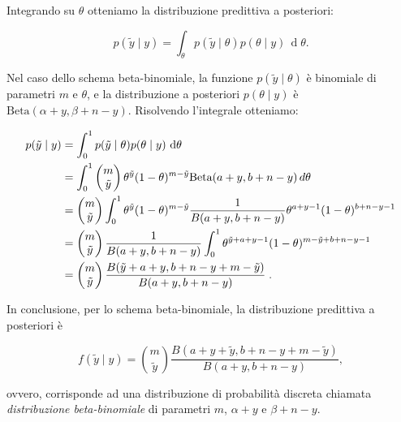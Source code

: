 \documentclass[
  11pt,
]{krantz}
\theoremstyle{definition}
\theoremstyle{definition}
\theoremstyle{definition}
\theoremstyle{definition}
\theoremstyle{remark}
\begin{document}
Integrando su \(\theta\) otteniamo la distribuzione predittiva a posteriori:

\begin{equation}
p(\tilde{y} \mid y) = \int_{\theta} p(\tilde{y} \mid \theta) p(\theta \mid y) \,\operatorname {d}\!\theta.
\end{equation}

Nel caso dello schema beta-binomiale, la funzione \(p(\tilde{y} \mid \theta)\) è binomiale di parametri \(m\) e \(\theta\), e la distribuzione a posteriori \(p(\theta \mid y)\) è \(\mbox{Beta}(\alpha + y, \beta + n - y)\). Risolvendo l'integrale otteniamo:

\begin{align}
p(\tilde{y} \mid y) &= \int_0^1 p(\tilde{y} \mid \theta)
p(\theta \mid y)\,\operatorname {d}\!\theta \notag\\
 &= \int_0^1 \begin{pmatrix}m\\\tilde{y}\end{pmatrix}
 \theta^{\tilde{y}}
(1-\theta)^{m-\tilde{y}} \mbox{Beta}(a+y,b+n-y) \, d\theta \notag\\
&= \begin{pmatrix}{m}\\\tilde{y}\end{pmatrix} \int_0^1 \theta^{\tilde{y}}
(1-\theta)^{m-\tilde{y}} \frac{1}{B(a+y, b+n-y)}\theta^{a+y-1}(1-\theta)^{b+n-y-1}\notag\\
&= \begin{pmatrix}{ m }\\\tilde{y}\end{pmatrix} \frac{1}{B(a+y, b+n-y)}\int_0^1 \theta^{\tilde{y}+a+y-1}(1-\theta)^{m-\tilde{y}+b+n-y-1}\notag\\
&= \begin{pmatrix}{ m }\\\tilde{y}\end{pmatrix} \frac{B(\tilde{y}+a+y,b+n-y+m-\tilde{y})}{B(a+y, b+n-y)} \; .
\label{eq:post-yprime-an-sol-betabin}
\end{align}

In conclusione, per lo schema beta-binomiale, la distribuzione predittiva a posteriori è

\begin{equation}
f(\tilde{y} \mid y) = \binom{m}{\tilde{y}} \frac{B(a+ y + \tilde{y}, b + n - y + m - \tilde{y})}{B(a+y, b+n-y)},
\end{equation}

ovvero, corrisponde ad una distribuzione di probabilità discreta chiamata \emph{distribuzione beta-binomiale} di parametri \(m\), \(\alpha+y\) e \(\beta+n-y\).
\end{document}
